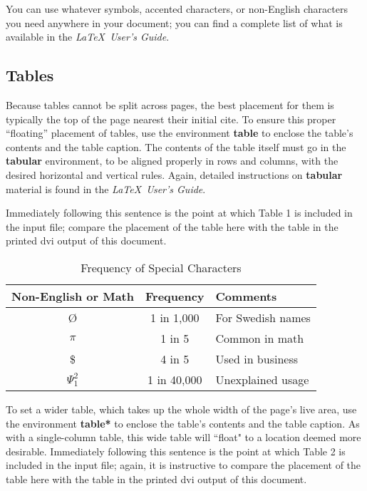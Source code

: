 \documentclass{sig-alternate-05-2015}
\begin{document}
	You can use whatever symbols, accented characters, or
	non-English characters you need anywhere in your document;
	you can find a complete list of what is
	available in the \textit{\LaTeX\
		User's Guide}\cite{Lamport:LaTeX}.
	

	\subsection{Tables}
	Because tables cannot be split across pages, the best
	placement for them is typically the top of the page
	nearest their initial cite.  To
	ensure this proper ``floating'' placement of tables, use the
	environment \textbf{table} to enclose the table's contents and
	the table caption.  The contents of the table itself must go
	in the \textbf{tabular} environment, to
	be aligned properly in rows and columns, with the desired
	horizontal and vertical rules.  Again, detailed instructions
	on \textbf{tabular} material
	is found in the \textit{\LaTeX\ User's Guide}.
	
	Immediately following this sentence is the point at which
	Table 1 is included in the input file; compare the
	placement of the table here with the table in the printed
	dvi output of this document.
	
	\begin{table}
		\centering
		\caption{Frequency of Special Characters}
		\begin{tabular}{|c|c|l|} \hline
			Non-English or Math&Frequency&Comments\\ \hline
			\O & 1 in 1,000& For Swedish names\\ \hline
			$\pi$ & 1 in 5& Common in math\\ \hline
			\$ & 4 in 5 & Used in business\\ \hline
			$\Psi^2_1$ & 1 in 40,000& Unexplained usage\\
			\hline\end{tabular}
	\end{table}
	
	To set a wider table, which takes up the whole width of
	the page's live area, use the environment
	\textbf{table*} to enclose the table's contents and
	the table caption.  As with a single-column table, this wide
	table will ``float" to a location deemed more desirable.
	Immediately following this sentence is the point at which
	Table 2 is included in the input file; again, it is
	instructive to compare the placement of the
	table here with the table in the printed dvi
	output of this document.
	
\end{document}
